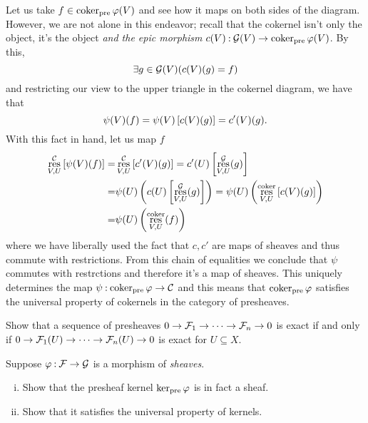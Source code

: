 \documentclass[12pt]{memoir}
\begin{document}
\begin{ptcbr}
\begin{center}
\begin{tikzcd}
    \end{tikzcd}
    \end{center}
    Let us take $f\in\coker_{\text{pre}}\vf(V)$ and see how it maps on both sides of the diagram. However, we are not alone in this endeavor; recall that the cokernel isn't only the object, it's the object \emph{and the epic morphism} $c(V)\:\cG(V)\to \coker_{\text{pre}}\vf(V)$. By this, 
    $$\exists g\in\cG(V)(c(V)(g)=f)$$
    and restricting our view to the upper triangle in the cokernel diagram, we have that 
    $$\psi(V)(f)=\psi(V)\bonj{c(V)(g)}=c'(V)(g).$$
    With this fact in hand, let us map $f$
    \begin{align*}
        \res_{V,U}^\cC\bonj{\psi(V)(f)}=&\res_{V,U}^\cC\bonj{c'(V)(g)}=c'(U)\bonj{\res_{V,U}^\cG(g)}\\
        =&\psi(U)\left(c(U)\bonj{\res_{V,U}^\cG(g)}\right)=\psi(U)\left(\res_{V,U}^{\coker}\bonj{c(V)(g)}\right)\\
        =&\psi(U)\left(\res_{V,U}^{\coker}(f)\right)
    \end{align*}
    where we have liberally used the fact that $c,c'$ are maps of sheaves and thus commute with restrictions. From this chain of equalities we conclude that $\psi$ commutes with restrctions and therefore it's a map of sheaves. This uniquely determines the map $\psi\:\coker_{\text{pre}}\vf\to\cC$ and this means that $\coker_{\text{pre}}\vf$ satisfies the universal property of cokernels in the category of presheaves.
 \end{ptcbr}

\begin{Ej}[2.3.H Vakil]
    Show that a sequence of presheaves $0\to\cF_1\to\dots\to\cF_n\to 0$ is exact if and only if $0\to\cF_1(U)\to\dots\to\cF_n(U)\to 0$ is exact for $U\subseteq X$.
\end{Ej}

\begin{Ej}[2.3.I Vakil]
    Suppose $\vf\:\cF\to\cG$ is a morphism of \emph{sheaves}.
    \begin{enumerate}[i)]
        \itemsep=-0.4em
        \item Show that the presheaf kernel $\ker_{\text{pre}}\vf$ is in fact a sheaf. 
        \item Show that it satisfies the universal property of kernels.
    \end{enumerate}
\end{Ej}
\end{document}
